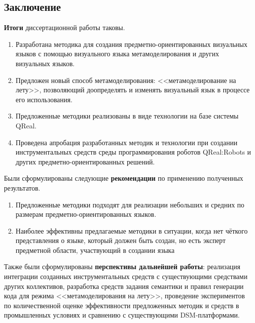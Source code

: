 \subsection*{\Large Заключение}
\textbf{Итоги} диссертационной работы таковы.
\begin{enumerate}
	\item Разработана методика для создания предметно-ориентированных визуальных языков с помощью 
		визуального языка метамоделирования и других визуальных языков.
	\item Предложен новый способ метамоделирования: <<метамоделирование на лету>>, позволяющий
		доопределять и изменять визуальный язык в процессе его использования.
	\item Предложенные методики реализованы в виде технологии на базе системы QReal.
	\item Проведена апробация разработанных методик и технологии при создании инструментальных средств 
		среды программирования роботов QReal:Robots и других предметно-ориентированных решений.
\end{enumerate}
Были сформулированы следующие \textbf{рекомендации} по применению полученных результатов.
\begin{enumerate}
	\item Предложенные методики подходят для реализации небольших и средних по размерам 
		предметно-ориентированных языков.
	\item Наиболее эффективны предлагаемые методики в ситуации, когда нет чёткого представления
		о языке, который должен быть создан, но есть эксперт предметной области, участвующий
		в создании языка
\end{enumerate}
Также были сформулированы \textbf{перспективы дальнейшей работы}: реализация интеграции 
созданных инструментальных средств с существующими средствами других коллективов, 
разработка средств задания семантики и правил генерации кода для режима <<метамоделирования
на лету>>, проведение экспериментов по количественной оценке эффективности предложенных методик 
и средств в промышленных условиях и сравнению с существующими DSM-платформами.






















